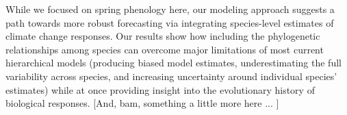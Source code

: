 \documentclass{article}\usepackage[]{graphicx}\usepackage[]{color}
\begin{document}
While we focused on spring phenology here, our modeling approach suggests a path towards more robust forecasting via integrating species-level estimates of climate change responses. Our results show how including the phylogenetic relationships among species can overcome major limitations of most current hierarchical models (producing biased model estimates, underestimating the full variability across species, and increasing uncertainty around individual species' estimates) while at once providing insight into the evolutionary history of biological responses. [And, bam, something a little more here ... ]

\end{document}

